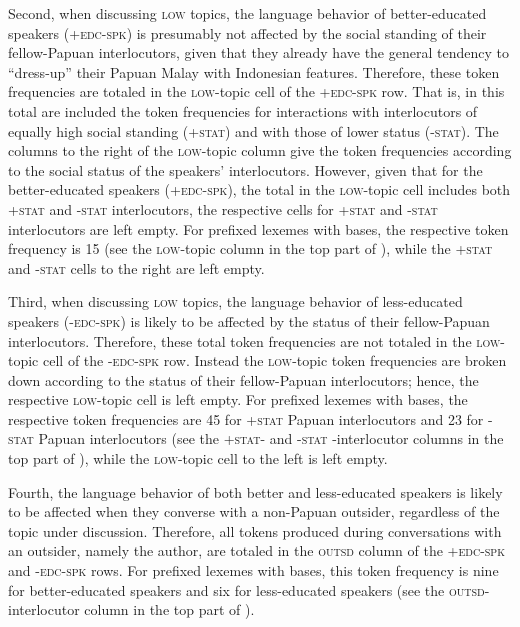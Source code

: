 Second, when discussing \textsc{low} topics, the language behavior of better-educated speakers (\textsc{+edc-spk}) is presumably not affected by the social standing of their fellow-Papuan interlocutors, given that they already have the general tendency to “dress-up” their Papuan Malay with Indonesian features. Therefore, these token frequencies are totaled in the \textsc{low}{}-topic cell of the \textsc{+edc-spk} row. That is, in this total are included the token frequencies for interactions with interlocutors of equally high social standing (\textsc{+stat}) and with those of lower status (\textsc{-stat}). The columns to the right of the \textsc{low}{}-topic column give the token frequencies according to the social status of the speakers’ interlocutors. However, given that for the better-educated speakers (\textsc{+edc-spk}), the total in the \textsc{low}{}-topic cell includes both \textsc{+stat} and \textsc{-stat} interlocutors, the respective cells for \textsc{+stat} and \textsc{-stat} interlocutors are left empty. For prefixed lexemes with  bases, the respective token frequency is 15 (see the \textsc{low}{}-topic column in the top part of ), while the \textsc{+stat} and \textsc{-stat} cells to the right are left empty.



Third, when discussing \textsc{low} topics, the language behavior of less-educated speakers (\textsc{-edc-spk}) is likely to be affected by the status of their fellow-Papuan interlocutors. Therefore, these total token frequencies are not totaled in the \textsc{low}{}-topic cell of the \textsc{-edc-spk} row. Instead the \textsc{low}{}-topic token frequencies are broken down according to the status of their fellow-Papuan interlocutors; hence, the respective \textsc{low}{}-topic cell is left empty. For prefixed lexemes with  bases, the respective token frequencies are 45 for \textsc{+stat} Papuan interlocutors and 23 for \textsc{-stat} Papuan interlocutors (see the \textsc{+stat-} and \textsc{-stat} -interlocutor columns in the top part of ), while the \textsc{low}{}-topic cell to the left is left empty.



Fourth, the language behavior of both better and less-educated speakers is likely to be affected when they converse with a non-Papuan outsider, regardless of the topic under discussion. Therefore, all tokens produced during conversations with an outsider, namely the author, are totaled in the \textsc{outsd} column of the \textsc{+edc-spk} and \textsc{-edc-spk} rows. For prefixed lexemes with  bases, this token frequency is nine for better-educated speakers and six for less-educated speakers (see the \textsc{outsd}{}-interlocutor column in the top part of ).



